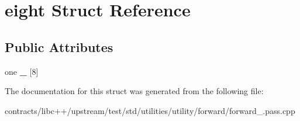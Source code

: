 \hypertarget{structeight}{}\section{eight Struct Reference}
\label{structeight}
\subsection*{Public Attributes}
\begin{DoxyCompactItemize}
\item 
\mbox{\label{structeight_a155c4a7e7706a32b1f1d9e4dafd86d7e}} 
one {\bfseries \+\_\+} \mbox{[}8\mbox{]}
\end{DoxyCompactItemize}


The documentation for this struct was generated from the following file\+:\begin{DoxyCompactItemize}
\item 
contracts/libc++/upstream/test/std/utilities/utility/forward/forward\+\_.\+pass.\+cpp\end{DoxyCompactItemize}
